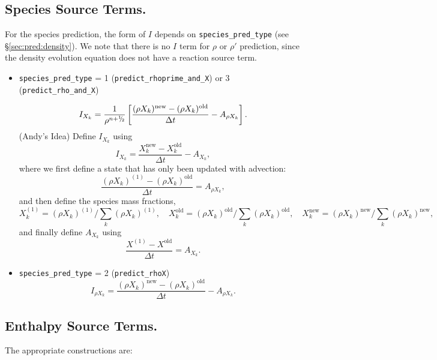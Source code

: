 \subsection{Species Source Terms.}
For the species prediction, the form of $I$ depends on
{\tt species\_pred\_type} (see \S \ref{sec:pred:density}).
We note that there is no $I$ term for $\rho$ or $\rho'$ prediction, since
the density evolution equation does not have a reaction source term.
\begin{itemize}
\item {\tt species\_pred\_type} = 1 ({\tt predict\_rhoprime\_and\_X})
or 3 ({\tt predict\_rho\_and\_X})

\begin{equation}
I_{X_k} = \frac{1}{\rho^{n+\myhalf}} \left [ 
      \frac{(\rho X_k)^\mathrm{new} - 
            (\rho X_k)^\mathrm{old}}{\Delta t} - A_{\rho X_k}  \right ].
\end{equation}
(Andy's Idea) Define $I_{X_k}$ using
\begin{equation}
I_{X_k} = \frac{X_k^\mathrm{new} - X_k^\mathrm{old}}{\Delta t} - A_{X_k},
\end{equation}
where we first define a state that has only been updated with advection:
\begin{equation}
\frac{(\rho X_k)^{(1)} - (\rho X_k)^\mathrm{old}}{\Delta t} = A_{\rho X_k},
\end{equation}
and then define the species mass fractions,
\begin{equation}
X_k^{(1)} = (\rho X_k)^{(1)} / \sum_k (\rho X_k)^{(1)}, \quad 
X_k^\mathrm{old} = (\rho X_k)^\mathrm{old} / \sum_k (\rho X_k)^\mathrm{old}, \quad 
X_k^\mathrm{new} = (\rho X_k)^\mathrm{new} / \sum_k (\rho X_k)^\mathrm{new},
\end{equation}
and finally define $A_{X_k}$ using
\begin{equation}
\frac{X^{(1)} - X^\mathrm{old}}{\Delta t}= A_{X_k}.
\end{equation}
\item {\tt species\_pred\_type} = 2 ({\tt predict\_rhoX})
\begin{equation}
I_{\rho X_k} = \frac{(\rho X_k)^\mathrm{new} - (\rho X_k)^\mathrm{old}}{\Delta t} - A_{\rho X_k}.
\label{eq:sdc:Irhoo}
\end{equation}
\end{itemize}

\subsection{Enthalpy Source Terms.}
The appropriate constructions are:

